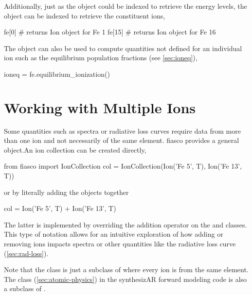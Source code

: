 Additionally, just as the  object could be indexed to retrieve the energy levels, the  object can be indexed to retrieve the constituent ions,
\begin{pyblock}[appendix1][baselinestretch=1,xleftmargin=3em]
fe[0] # returns Ion object for Fe 1
fe[15] # returns Ion object for Fe 16
\end{pyblock}

The  object can also be used to compute quantities not defined for an individual ion such as the equilibrium population fractions (see \autoref{sec:ioneq}),
\begin{pyblock}[appendix1][baselinestretch=1,xleftmargin=3em]
ioneq = fe.equilibrium_ionization()
\end{pyblock}

\section{Working with Multiple Ions}\label{sec:ion-collection}

Some quantities such as spectra or radiative loss curves require data from more than one ion and not necessarily of the same element. fiasco provides a general  object.An ion collection can be created directly,
\begin{pyblock}[appendix1][baselinestretch=1,xleftmargin=3em]
from fiasco import IonCollection
col = IonCollection(Ion('Fe 5', T), Ion('Fe 13', T))
\end{pyblock}
or by literally adding the objects together
\begin{pyblock}[appendix1][baselinestretch=1,xleftmargin=3em]
col = Ion('Fe 5', T) + Ion('Fe 13', T)
\end{pyblock}
The latter is implemented by overriding the addition operator on the  and  classes. This type of notation allows for an intuitive exploration of how adding or removing ions impacts spectra or other quantities like the radiative loss curve (\autoref{sec:rad-loss}).

Note that the  class is just a subclass of  where every ion is from the same element. The  class (\autoref{sec:atomic-physics}) in the synthesizAR forward modeling code is also a subclass of .